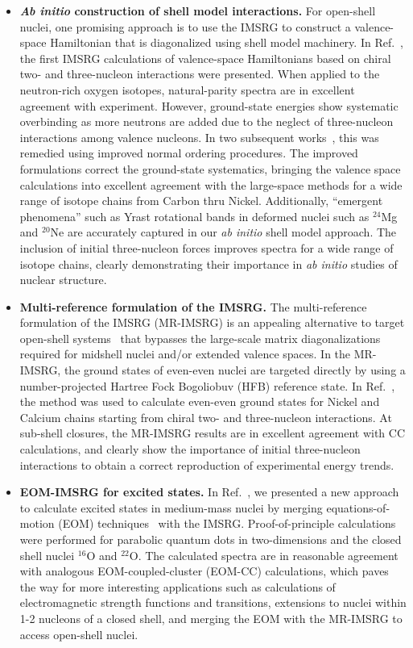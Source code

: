 \begin{itemize}
 \item {\bf \emph{Ab initio} construction of shell model
 interactions.} For open-shell nuclei, one promising approach is to
 use the IMSRG to construct a valence-space Hamiltonian that is diagonalized using shell model
 machinery.  In Ref.~\cite{Bogner:2014tg}, the first IMSRG calculations of valence-space Hamiltonians 
 based on chiral two- and three-nucleon interactions 
 were presented. When applied to the neutron-rich oxygen isotopes,
 natural-parity spectra are in excellent
 agreement with experiment. However, ground-state energies show systematic overbinding as more
 neutrons are added due to the neglect of
 three-nucleon interactions among valence nucleons.  In two
 subsequent works~\cite{Stroberg:2015ymf,Stroberg:2016ung}, this was
 remedied using improved normal ordering procedures. The improved formulations correct the ground-state
 systematics, bringing the valence space calculations into excellent
 agreement with the large-space methods for a wide range of isotope
 chains from Carbon thru Nickel. Additionally, ``emergent phenomena''
 such as Yrast rotational bands in deformed nuclei such as $^{24}$Mg
 and $^{20}$Ne are accurately captured in our \emph{ab initio} shell model
 approach. The inclusion of initial three-nucleon forces improves
 spectra for a wide range of isotope chains, clearly demonstrating
 their importance in \emph{ab initio} studies of nuclear structure.
 
 \item {\bf Multi-reference formulation of the IMSRG.} The
 multi-reference formulation of the IMSRG (MR-IMSRG) is an appealing alternative to target open-shell
 systems~\cite{Hergert:2013ij} that bypasses the
 large-scale matrix diagonalizations required for
 midshell nuclei and/or extended valence spaces. In the MR-IMSRG, the
 ground states of even-even nuclei are targeted directly by using a
 number-projected Hartree Fock Bogoliobuv (HFB) reference state. In
 Ref.~\cite{Hergert:2014vn}, the method was used to calculate
 even-even ground states for Nickel and Calcium chains starting from
 chiral two- and three-nucleon interactions. At sub-shell closures,
 the MR-IMSRG results are in excellent agreement with CC calculations,
 and clearly show the importance of initial three-nucleon interactions
 to obtain a correct reproduction of experimental energy trends.
 
 \item {\bf EOM-IMSRG for excited states.}  In
 Ref.~\cite{Parzuchowski:2016njm}, we presented a new approach to 
 calculate excited states in medium-mass nuclei by merging 
 equations-of-motion (EOM) techniques~\cite{Rowe:1968eq} with the IMSRG. 
 Proof-of-principle calculations were performed for parabolic
 quantum dots in two-dimensions and the closed shell nuclei $^{16}$O
 and $^{22}$O.  The calculated spectra are in reasonable agreement with
 analogous EOM-coupled-cluster (EOM-CC) calculations, which paves the
 way for more interesting applications such as calculations of electromagnetic strength functions and transitions,
 extensions to nuclei within 1-2 nucleons of a closed shell, and merging the EOM with the MR-IMSRG to 
 access open-shell nuclei.


\end{itemize}
